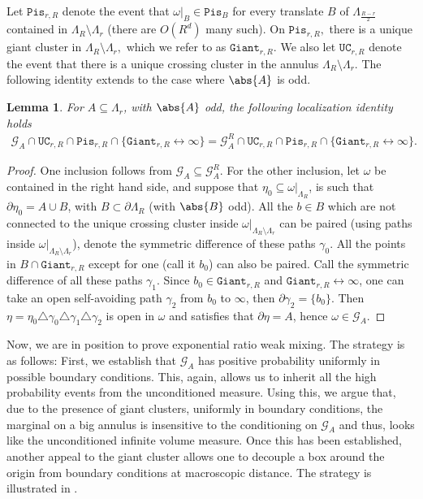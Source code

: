 \documentclass[article,11pt,reqno]{amsart}
\newcommand{\cc}{\leftrightarrow}
\newcommand{\Giant}{\mathtt{Giant}}
\newcommand{\Pis}{\mathtt{Pis}}
\newtheorem{lemma}[theorem]{Lemma}
\begin{document}
Let $\mathtt{Pis}_{r,R}$ denote the event that $\omega|_{B}\in \mathtt{Pis}_B$ for every translate $B$ of $\Lambda_{\frac{R-r}{2}}$ contained in $\Lambda_R\setminus \Lambda_r$ (there are $O(R^d)$ many such).  On $\mathtt{Pis}_{r,R},$ there is a unique giant cluster in $\Lambda_R\setminus \Lambda_r,$ which we refer to as $\mathtt{Giant}_{r,R}.$
We also let $\mathtt{UC}_{r,R}$ denote the event that there is a unique crossing cluster in the annulus $\Lambda_R \setminus \Lambda_r$. The following identity extends  to the case where $\abs{A}$ is odd.
\begin{lemma}\label{lemma:G_A_decoupling_lemma}
    For $A \subseteq \Lambda_r$, with $\abs{A}$ odd, the following localization identity holds
    \begin{align*}
        \mathcal{G}_A \cap \mathtt{UC}_{r,R} \cap \Pis_{r,R} \cap \{ \Giant_{r,R} \cc \infty \} =
        \mathcal{G}^{R}_A \cap \mathtt{UC}_{r,R} \cap \Pis_{r,R} \cap \{ \Giant_{r,R} \cc \infty \}. 
    \end{align*}
\end{lemma}
\begin{proof}
  One inclusion follows from  $\mathcal{G}_A \subseteq \mathcal{G}_A^{R}$. 
  For the other inclusion, let $\omega$ be contained in the right hand side, and suppose that $\eta_0 \subseteq \omega\vert_{\Lambda_{R}}$, is such that $\partial \eta_0 = A \cup B$, with $B \subset \partial \Lambda_{R}$  (with $\abs{B}$ odd). All the $b \in B$ which are not connected to the unique crossing cluster inside $\omega\vert_{\Lambda_{R}\setminus \Lambda_r}$ can be paired (using paths inside $\omega\vert_{\Lambda_{R}\setminus \Lambda_r}$), denote the symmetric difference of these paths $\gamma_0$. All the points in $B \cap \Giant_{r,R}$ except for one (call it $b_0$) can also be paired. Call the symmetric difference of all these paths $\gamma_1$.  
  Since $b_0 \in \Giant_{r,R}$ and $\Giant_{r,R} \cc \infty$, one can take an open self-avoiding path $\gamma_2$ from $b_0 $ to $\infty$, then $\partial \gamma_2 = \{b_0\}$.
  Then $\eta =\eta_0 \triangle \gamma_0 \triangle \gamma_1 \triangle \gamma_2$ is open in $\omega$ and satisfies that $\partial \eta = A$, hence $\omega \in \mathcal{G}_A$. 
\end{proof}





Now, we are in position to prove exponential ratio weak mixing. The strategy is as follows: First, we establish that $\mathcal{G}_A$ has positive probability uniformly  in possible boundary conditions. This, again, allows us to inherit all the high probability events from the unconditioned measure. Using this, we argue that, due to the presence of giant clusters, uniformly in boundary conditions, the marginal on a big annulus is insensitive to the conditioning on $\mathcal{G}_A$ and thus, looks like the unconditioned infinite volume measure. Once this has been established, another appeal to the giant cluster allows one to decouple a box around the origin from boundary conditions at macroscopic distance.  The strategy is illustrated in .
\end{document}
